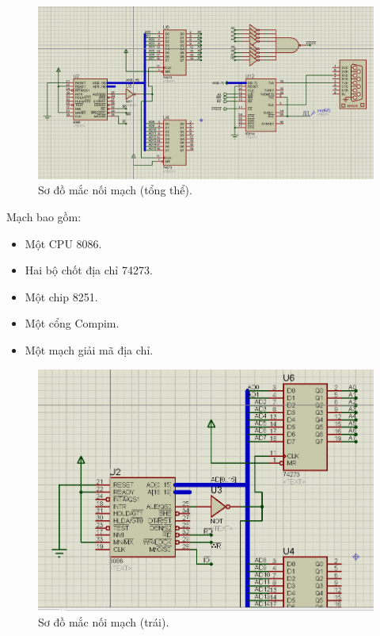 \documentclass[../report.tex]{subfiles}
\begin{document}
\begin{figure}[H]
\centering
\includegraphics[width=\textwidth]{figures/diagram.png}
\caption{Sơ đồ mắc nối mạch (tổng thể).}
\end{figure}

\noindent Mạch bao gồm: 
\begin{itemize}
\item Một CPU 8086.
\item Hai bộ chốt địa chỉ 74273.
\item Một chip 8251.
\item Một cổng Compim.
\item Một mạch giải mã địa chỉ. 
\end{itemize}

\begin{figure}[H]
\centering
\includegraphics[width=\textwidth]{figures/diagram-left.png}
\caption{Sơ đồ mắc nối mạch (trái).}
\end{figure}
\end{document}
